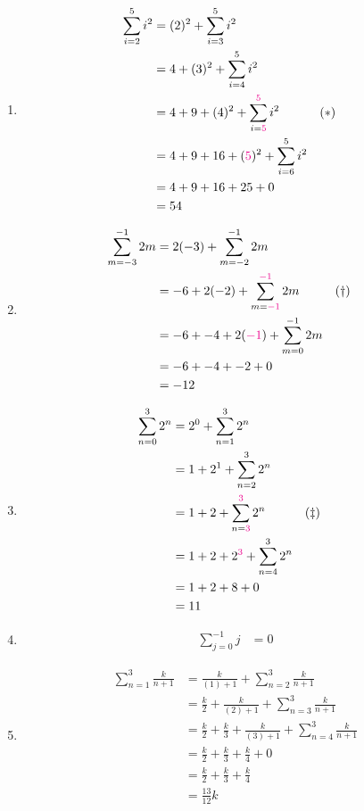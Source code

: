 \begin{enumerate}
  \item \begin{align*}
    \sum_{i=2}^{5} i^2 &= (2)^2 + \sum_{i=3}^{5} i^2\\
    &= 4 + (3)^2 + \sum_{i=4}^{5} i^2\\
    &= 4 + 9 + (4)^2 + \sum_{i={\color{magenta}5}}^{{\color{magenta}5}} i^2 && (*)\\
    &= 4 + 9 + 16 + ({\color{magenta}5})^2 + \sum_{i=6}^{5} i^2\\
    &= 4 + 9 + 16 + 25 + 0\\
    &= 54
  \end{align*}

  \item \begin{align*}
    \sum_{m=-3}^{-1} 2m  &= 2(-3) + \sum_{m=-2}^{-1} 2m\\
    &= -6 + 2(-2) + \sum_{m={\color{magenta}-1}}^{{\color{magenta}-1}} 2m  && (\dag)\\
    &= -6 + -4 + 2({\color{magenta}-1}) + \sum_{m=0}^{-1} 2m\\
    &= -6 + -4 + -2 + 0\\
    &= -12
  \end{align*}

  \item \begin{align*}
    \sum_{n=0}^{3} 2^n &= 2^0 + \sum_{n=1}^{3} 2^n\\
    &= 1 + 2^1 + \sum_{n=2}^{3} 2^n\\
    &= 1 + 2 + \sum_{n={\color{magenta}3}}^{{\color{magenta}3}} 2^n  && (\ddag)\\
    &= 1 + 2 + 2^{\color{magenta}3} + \sum_{n=4}^{3} 2^n\\
    &= 1 + 2 + 8 + 0\\
    &= 11
  \end{align*}

  \item \begin{align*}
    \sum_{j=0}^{-1} j &= 0
  \end{align*}

  \item \begin{align*}
    \sum_{n=1}^{3} \frac{k}{n+1} &= \frac{k}{(1)+1} + \sum_{n=2}^{3} \frac{k}{n+1}\\
    &= \frac{k}{2} + \frac{k}{(2)+1} + \sum_{n=3}^{3} \frac{k}{n+1}\\
    &= \frac{k}{2} + \frac{k}{3} + \frac{k}{(3)+1} + \sum_{n=4}^{3} \frac{k}{n+1}\\
    &= \frac{k}{2} + \frac{k}{3} + \frac{k}{4} + 0\\
    &= \frac{k}{2} + \frac{k}{3} + \frac{k}{4}\\
    &= \frac{13}{12}k
  \end{align*}
  

\end{enumerate}
